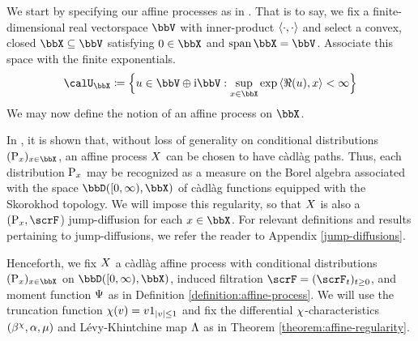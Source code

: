We start by specifying our affine processes as in \cite{keller2015}.
That is to say, we fix a finite-dimensional real vectorspace $\vecSpace$ with inner-product ${\langle \cdot , \cdot \rangle}$ and select a convex, closed $\stateSpace \subseteq \vecSpace$ satisfying $0 \in \stateSpace$ and $\operatorname{span}\stateSpace = \vecSpace$.
Associate this space with the finite exponentials.
\begin{equation*}
  \boundedSpace \defeq \Big\{ \momentVar \in \vecSpace \oplus \im\vecSpace : \sup_{\stateVar \in \stateSpace} \exp\prj{\Re(\momentVar)}{\stateVar} < \infty \Big\}
\end{equation*}
We may now define the notion of an affine process on $\stateSpace$.





In \cite[Theorem 1.2.7]{cuchiero2011}, it is shown that, without loss of generality on conditional distributions $(\Prb_\stateVar)_{\stateVar\in\stateSpace}$, an affine process $X$ can be chosen to have c\`adl\`ag paths.
Thus, each distribution ${\operatorname{P}}_x$ may be recognized as a measure on the Borel algebra associated with the space $\pathSpace{[0,\infty)}{\stateSpace}$ of c\`adl\`ag functions equipped with the Skorokhod topology.
We will impose this regularity, so that $X$ is also a $(\Prb_\stateVar, \scrF$) jump-diffusion for each $\stateVar \in \stateSpace$.
For relevant definitions and results pertaining to jump-diffusions, we refer the reader to Appendix \ref{jump-diffusions}.




Henceforth, we fix $X$ a c\`adl\`ag affine process with conditional distributions $(\Prb_\stateVar)_{\stateVar\in\stateSpace}$ on $\pathSpace{[0,\infty)}{\stateSpace}$, induced filtration $\scrF=(\scrF_t)_{t\geq0}$, and moment function $\Psi$ as in Definition \ref{definition:affine-process}.
We will use the truncation function $\chi(v) = v 1_{|v|\leq 1}$ and fix the differential $\chi$-characteristics $(\beta^\chi, \alpha, \mu)$ and L\'evy-Khintchine map $\Lambda$ as in Theorem \ref{theorem:affine-regularity}.

